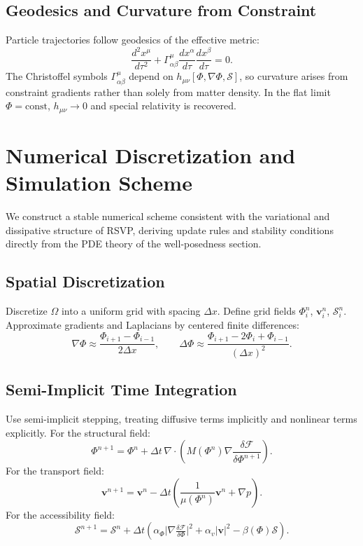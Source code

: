\documentclass[11pt, a4paper, twocolumn]{article}
\newcommand{\Sfield}{\mathcal{S}}
\newcommand{\F}{\mathcal{F}}
\begin{document}
\subsection{Geodesics and Curvature from Constraint}

Particle trajectories follow geodesics of the effective metric:
\[
    \frac{d^2x^\mu}{d\tau^2}
    + \Gamma^\mu_{\alpha\beta}\frac{dx^\alpha}{d\tau}\frac{dx^\beta}{d\tau}
    = 0.
\]
The Christoffel symbols $\Gamma^\mu_{\alpha\beta}$ depend on
$h_{\mu\nu}[\Phi,\nabla\Phi,\Sfield]$, so curvature arises from constraint
gradients rather than solely from matter density. In the flat limit
$\Phi = \mathrm{const}$, $h_{\mu\nu} \to 0$ and special relativity is
recovered.

\section{Numerical Discretization and Simulation Scheme}

We construct a stable numerical scheme consistent with the variational and
dissipative structure of RSVP, deriving update rules and stability conditions
directly from the PDE theory of the well-posedness section.

\subsection{Spatial Discretization}

Discretize $\Omega$ into a uniform grid with spacing $\Delta x$. Define grid
fields $\Phi_i^n$, $\mathbf{v}_i^n$, $\Sfield_i^n$. Approximate gradients and
Laplacians by centered finite differences:
\[
    \nabla\Phi \approx \frac{\Phi_{i+1}-\Phi_{i-1}}{2\Delta x},
    \qquad
    \Delta\Phi \approx \frac{\Phi_{i+1}-2\Phi_i+\Phi_{i-1}}{(\Delta x)^2}.
\]

\subsection{Semi-Implicit Time Integration}

Use semi-implicit stepping, treating diffusive terms implicitly and nonlinear
terms explicitly. For the structural field:
\[
    \Phi^{n+1}
    =
    \Phi^n
    + \Delta t\,\nabla\cdot\!\left(M(\Phi^n)\nabla\frac{\delta\F}{\delta\Phi^{n+1}}\right).
\]
For the transport field:
\[
    \mathbf{v}^{n+1}
    =
    \mathbf{v}^n
    - \Delta t\left(\frac{1}{\mu(\Phi^n)}\mathbf{v}^n + \nabla p\right).
\]
For the accessibility field:
\[
    \Sfield^{n+1}
    =
    \Sfield^n
    + \Delta t\left(
        \alpha_\Phi\bigl|\nabla\tfrac{\delta\F}{\delta\Phi}\bigr|^2
        + \alpha_v|\mathbf{v}|^2
        - \beta(\Phi)\Sfield
    \right).
\]
\end{document}
